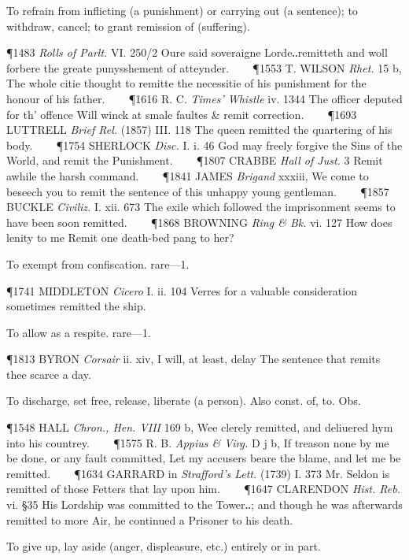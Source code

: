 \begin{description}[wide, labelwidth=!, labelindent=0pt]
\begin{myenumerate}
 To refrain from inflicting (a punishment) or carrying out (a sentence); to withdraw, cancel; to grant remission of (suffering).

\P 1483  \textit{Rolls of Parlt.} VI. 250/2 Oure said soveraigne Lorde‥remitteth and woll forbere the greate punysshement of atteynder.    
\P 1553 T. WILSON  \textit{Rhet.} 15 b, The whole citie thought to remitte the necessitie of his punishment for the honour of his father.    
\P 1616 R. C. \textit{Times'  Whistle} iv. 1344 The  officer deputed for th' offence Will winck at smale faultes \& remit correction.    
\P 1693 LUTTRELL  \textit{Brief Rel.} (1857) III. 118 The queen remitted the quartering of his body.    
\P 1754 SHERLOCK  \textit{Disc.} I. i. 46 God may freely forgive the Sins of the World, and remit the Punishment.    
\P 1807 CRABBE  \textit{Hall of Just.} 3 Remit awhile the harsh command.    
\P 1841 JAMES  \textit{Brigand} xxxiii, We come to beseech you to remit the sentence of this unhappy young gentleman.    
\P 1857 BUCKLE  \textit{Civiliz.} I. xii. 673 The exile which followed the imprisonment seems to have been soon remitted.    
\P 1868 BROWNING  \textit{Ring \& Bk.} vi. 127 How does lenity to me Remit one death-bed pang to her?

 To exempt from confiscation. rare—1.

\P 1741 MIDDLETON  \textit{Cicero} I. ii. 104 Verres for a valuable consideration sometimes remitted the ship.

 To allow as a respite. rare—1.

\P 1813 BYRON  \textit{Corsair} ii. xiv, I will, at least, delay The sentence that remits thee scarce a day.

 To discharge, set free, release, liberate (a person). Also const. of, to. Obs.

\P 1548 HALL  \textit{Chron., Hen. VIII} 169 b, Wee clerely remitted, and deliuered hym into his countrey.    
\P 1575 R. B. \textit{Appius  \& Virg.} D j b, If treason none by me be done, or any fault committed, Let my accusers beare the blame, and let me be remitted.    
\P 1634 GARRARD in  \textit{Strafford's Lett.} (1739) I. 373 Mr. Seldon is remitted of those Fetters that lay upon him.    
\P 1647 CLARENDON  \textit{Hist. Reb.} vi. §35 His Lordship was committed to the Tower‥; and though he was afterwards remitted to more Air, he continued a Prisoner to his death.

 To give up, lay aside (anger, displeasure, etc.) entirely or in part.


\end{myenumerate}
\end{description}
